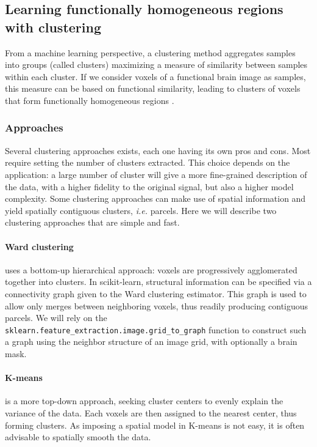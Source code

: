 \documentclass{frontiersSCNS} %
\begin{document}
\subsection{Learning functionally homogeneous regions with clustering}
\label{clustering}

From a machine learning perspective, a clustering method aggregates 
samples into groups (called clusters) maximizing a measure of similarity
between samples within each cluster. If we consider voxels of a functional brain image
as samples, this 
measure can be based on functional similarity, leading to clusters of voxels
that form functionally homogeneous regions \citep{thirion2006}.

\subsubsection{Approaches}

Several clustering approaches exists, each one having its own pros and
cons. Most require setting the number of clusters extracted. This choice
depends on the application: a large number of cluster will give a more
fine-grained description of the data, with a higher fidelity to the
original signal, but also a higher model complexity. Some clustering
approaches can make use of spatial information and yield
spatially contiguous clusters, \emph{i.e.} parcels. Here we will describe
two clustering approaches that are simple and fast.

\paragraph{Ward clustering} uses a bottom-up hierarchical approach:
voxels are progressively agglomerated together into clusters. In
scikit-learn, structural information can be specified via a connectivity
graph given to the Ward clustering estimator. This graph is used to allow
only merges between neighboring voxels, thus readily producing contiguous
parcels. We will rely on the {\tt
sklearn.feature\_extraction.image.grid\_to\_graph} function to
construct such a graph using the neighbor structure of an image grid,
with optionally a brain mask.

\paragraph{K-means} is a more top-down approach, seeking cluster centers
to evenly explain the variance of the data. Each voxels are then assigned
to the nearest center, thus forming clusters. As imposing a spatial model
in K-means is not easy, it is often advisable to spatially smooth the
data.
\end{document}
